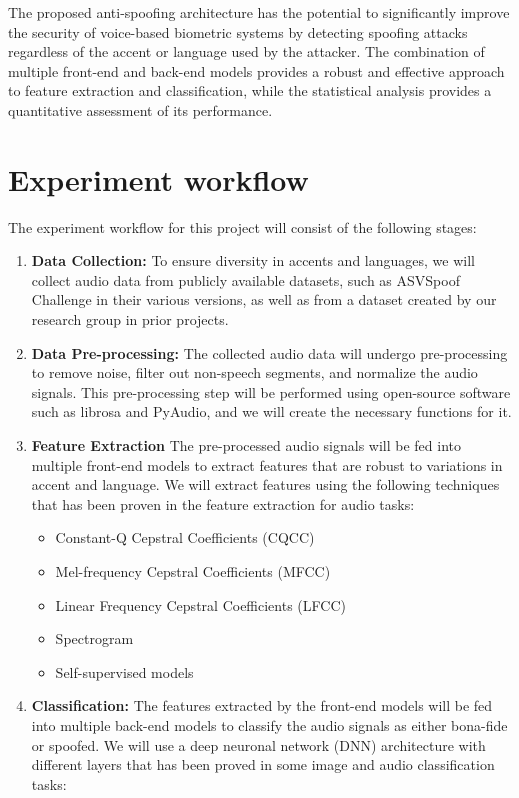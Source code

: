 The proposed anti-spoofing architecture has the potential to significantly improve the security of voice-based biometric systems by detecting spoofing attacks regardless of the accent or language used by the attacker. The combination of multiple front-end and back-end models provides a robust and effective approach to feature extraction and classification, while the statistical analysis provides a quantitative assessment of its performance.

\section{Experiment workflow}

The experiment workflow for this project will consist of the following stages:

\begin{enumerate}
    \item \textbf{Data Collection:} To ensure diversity in accents and languages, we will collect audio data from publicly available datasets, such as ASVSpoof Challenge in their various versions, as well as from a dataset created by our research group in prior projects.
    \item \textbf{Data Pre-processing:} The collected audio data will undergo pre-processing to remove noise, filter out non-speech segments, and normalize the audio signals. This pre-processing step will be performed using open-source software such as librosa and PyAudio, and we will create the necessary functions for it.
    \item \textbf{Feature Extraction} The pre-processed audio signals will be fed into multiple front-end models to extract features that are robust to variations in accent and language. We will extract features using the following techniques that has been proven in the feature extraction for audio tasks: 
    \begin{itemize}
        \item Constant-Q Cepstral Coefficients (CQCC)
        \item Mel-frequency Cepstral Coefficients (MFCC)
        \item Linear Frequency Cepstral Coefficients (LFCC)
        \item Spectrogram
        \item Self-supervised models
    \end{itemize}
    \item \textbf{Classification:} The features extracted by the front-end models will be fed into multiple back-end models to classify the audio signals as either bona-fide or spoofed. We will use a deep neuronal network (DNN) architecture with different layers that has been proved in some image and audio classification tasks:

\end{enumerate}

